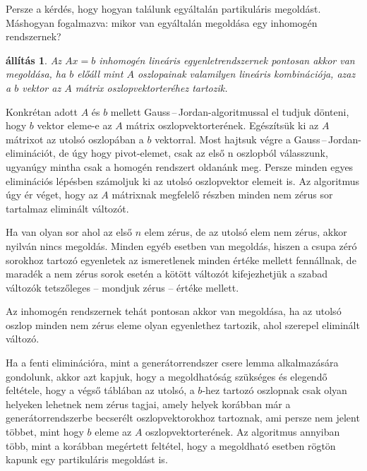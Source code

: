 \documentclass[a4paper, showtrims]{memoir}
\theoremstyle{plain}
\newtheorem{proposition}{állítás}[chapter]
\theoremstyle{remark}
\theoremstyle{definition}
\begin{document}
Persze a kérdés, hogy hogyan találunk egyáltalán partikuláris megoldást.
Máshogyan fogalmazva: mikor van egyáltalán megoldása egy inhomogén rendszernek?
\begin{proposition}
	Az $Ax=b$ inhomogén lineáris egyenletrendszernek pontosan akkor van megoldása,
	ha $b$ előáll mint $A$ oszlopainak valamilyen lineáris kombinációja,
	azaz a $b$ vektor az $A$ mátrix oszlopvektorteréhez tartozik.
\end{proposition}
Konkrétan adott $A$ és $b$ mellett Gauss\,--\,Jordan-algoritmussal  el tudjuk dönteni, hogy
$b$ vektor eleme-e az $A$ mátrix oszlopvektorterének.
Egészítsük ki az $A$ mátrixot az utolsó oszlopában a $b$ vektorral.
Most hajtsuk végre a Gauss\,--\,Jordan-eliminációt, de úgy hogy pivot-elemet,
csak az első n oszlopból válasszunk, ugyanúgy mintha csak a homogén rendszert oldanánk meg.
Persze minden egyes eliminációs lépésben számoljuk ki az utolsó oszlopvektor elemeit is.
Az algoritmus úgy ér véget,
hogy az $A$ mátrixnak megfelelő részben minden nem zérus sor tartalmaz eliminált változót.

Ha van olyan sor ahol az első $n$ elem zérus, de az utolsó elem nem zérus,
akkor nyilván nincs megoldás.
Minden egyéb esetben van megoldás,
hiszen a csupa zéró sorokhoz tartozó egyenletek az ismeretlenek minden értéke mellett fennállnak,
de maradék a nem zérus sorok esetén a kötött változót
kifejezhetjük a szabad változók tetszőleges -- mondjuk zérus -- értéke mellett.

Az inhomogén rendszernek tehát pontosan akkor van megoldása,
ha az utolsó oszlop minden nem zérus eleme olyan egyenlethez tartozik,
ahol szerepel eliminált változó.

Ha a fenti eliminációra, mint a generátorrendszer csere lemma alkalmazására gondolunk,
akkor azt kapjuk, hogy a megoldhatóság szükséges és elegendő feltétele,
hogy a végső táblában az utolsó, a $b$-hez tartozó oszlopnak csak olyan helyeken lehetnek nem zérus tagjai,
amely helyek korábban már a generátorrendszerbe becserélt oszlopvektorokhoz tartoznak,
ami persze nem jelent többet, mint hogy $b$ eleme az $A$ oszlopvektorterének.
Az algoritmus annyiban több, mint a korábban megértett feltétel,
hogy a megoldható esetben rögtön kapunk egy partikuláris megoldást is.
\end{document}
